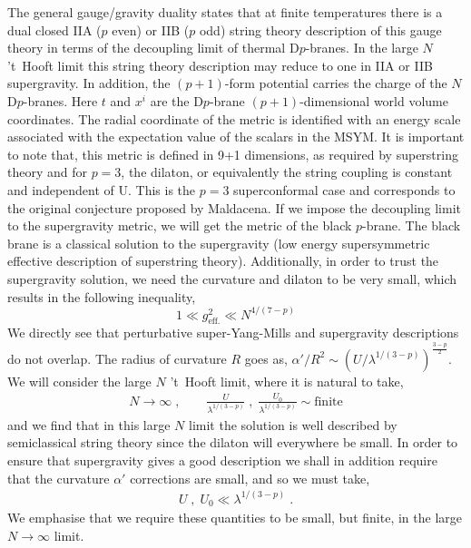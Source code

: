 The general gauge/gravity duality \cite{Itzhaki:1998dd} 
states that at finite temperatures there is a dual closed IIA ($p$ even) or IIB ($p$ odd)
string theory description of this gauge theory in terms of the decoupling limit of thermal D$p$-branes. 
 In the large $N$ 't~Hooft limit this string theory description may reduce to one in IIA or IIB supergravity. 
In addition, the $(p+1)$-form potential carries the charge of the $N$ D$p$-branes. Here $t$ and $x^i$ 
are the D$p$-brane $(p+1)$-dimensional world volume coordinates. The radial coordinate of the metric 
is identified with an energy scale associated with the expectation value of the scalars in the MSYM. 
It is important to note that, this metric is defined in 9+1 dimensions, as required by superstring theory and 
for $p=3$, the dilaton, or equivalently the string coupling is constant and independent of U.
This is the $p=3$ superconformal case and corresponds to the original conjecture proposed by Maldacena. 
If we impose the decoupling limit to the supergravity metric, we will get the metric of the black $p$-brane. 
The black brane is a classical solution to the supergravity (low energy supersymmetric effective 
description of superstring theory). Additionally, in 
order to trust the supergravity solution, we need the curvature and 
dilaton to be very small, which results in the following inequality, 
\begin{equation}
1 \ll g_{\text{eff.}}^{2} \ll N^{4/(7-p)} 
\end{equation}
We directly see that perturbative super-Yang-Mills and supergravity descriptions do not overlap. 
The radius of curvature $R$ goes as,
$\alpha' /R^2 \sim \left( U / \lambda^{1/(3-p) } \right)^{\frac{3-p}{2} }$. 
We will consider the large $N$ 't~Hooft limit, where it is natural to take,
\begin{eqnarray}
N \to \infty \; , \qquad \frac{U}{\lambda^{1/(3-p)}}  \; , \; \frac{U_0}{\lambda^{1/(3-p)}}  \sim \mathrm{finite}
\end{eqnarray}
and we find that in this large $N$ limit the solution is well described by 
semiclassical string theory since the dilaton will everywhere be small. In order to ensure that supergravity 
gives a good description we shall in addition require that the curvature $\alpha'$ corrections are small, 
and so we must take,
\begin{eqnarray}
U  \; , \; U_0 \ll \lambda^{1/(3-p)} \; .
\end{eqnarray}
We emphasise that we require these quantities to be small, but finite, in the large $N \to \infty$ limit. 

